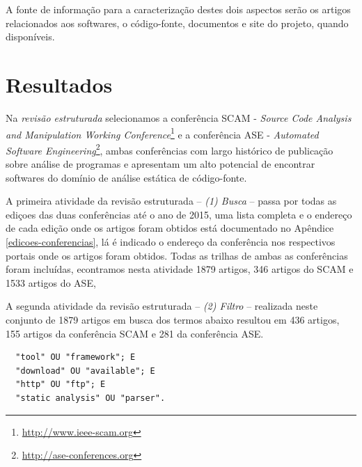 %
%

A fonte de informação para a caracterização destes dois aspectos serão os
artigos relacionados aos softwares, o código-fonte, documentos e site do
projeto, quando disponíveis.

\section{Resultados}

Na {\it revisão estruturada} selecionamos a conferência SCAM - {\it
Source Code Analysis and Manipulation Working
Conference}\footnote{\url{http://www.ieee-scam.org}} e a conferência ASE - {\it
Automated Software Engineering}\footnote{\url{http://ase-conferences.org}},
ambas conferências com largo histórico de publicação sobre análise de
programas e apresentam um alto potencial de encontrar softwares do domínio de
análise estática de código-fonte.

A primeira atividade da revisão estruturada -- {\it (1) Busca} -- passa por
todas as ediçoes das duas conferências até o ano de 2015, uma lista completa
e o endereço de cada edição onde os artigos foram obtidos está documentado no
Apêndice \ref{edicoes-conferencias}, lá é indicado o endereço da conferência
nos respectivos portais onde os artigos foram obtidos. Todas as trilhas de
ambas as conferências foram incluídas, econtramos nesta atividade 1879 artigos, 346 artigos
do SCAM e 1533 artigos do ASE, 


A segunda atividade da revisão estruturada -- {\it (2) Filtro} -- realizada neste
conjunto de 1879 artigos em busca dos termos abaixo resultou em 436 artigos,
155 artigos da conferência SCAM e 281 da conferência ASE.

\begin{verbatim}
  "tool" OU "framework"; E
  "download" OU "available"; E
  "http" OU "ftp"; E
  "static analysis" OU "parser".
\end{verbatim}

